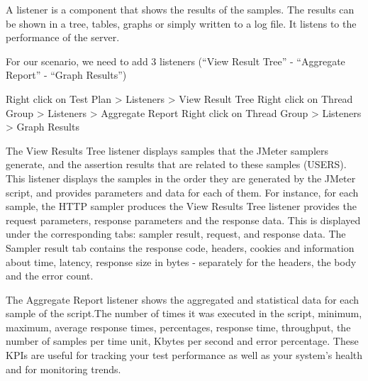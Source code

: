 \documentclass[letterpaper,10pt,english]{sphinxmanual}
\begin{document}

A listener is a component that shows the results of the samples. The results can be shown in a tree, tables, graphs or simply written to a log file. It listens to the performance of the server.

For our scenario, we need to add 3 listeners (“View Result Tree” - “Aggregate Report” - “Graph Results”)

Right click on Test Plan \textendash{}\textgreater{} Listeners \textendash{}\textgreater{} View Result Tree
Right click on Thread Group \textendash{}\textgreater{} Listeners \textendash{}\textgreater{} Aggregate Report
Right click on Thread Group \textendash{}\textgreater{} Listeners \textendash{}\textgreater{} Graph Results

The View Results Tree listener displays samples that the JMeter samplers generate, and the assertion results that are related to these samples (USERS). This listener displays the samples in the order they are generated by the JMeter script, and provides parameters and data for each of them.
For instance, for each sample, the HTTP sampler produces the View Results Tree listener provides the request parameters, response parameters and the response data. This is displayed under the corresponding tabs: sampler result, request, and response data.
The Sampler result tab contains the response code, headers, cookies and information about time, latency, response size in bytes - separately for the headers, the body and the error count.

The Aggregate Report listener shows the aggregated and statistical data for each sample of the script.The number of times it was executed in the script, minimum, maximum, average response times, percentages, response time, throughput, the number of samples per time unit, Kbytes per second and error percentage. These KPIs are useful for tracking your test performance as well as your system’s health and for monitoring trends.
\end{document}
